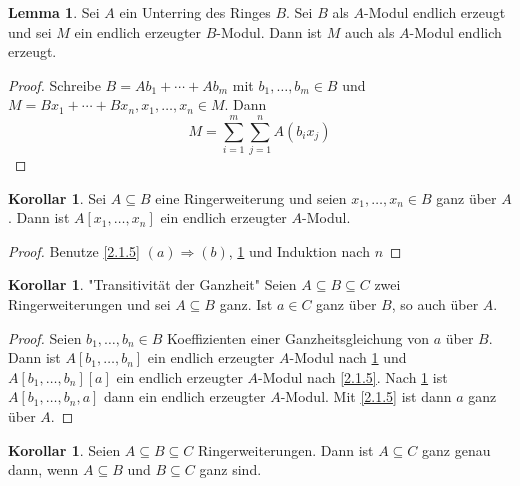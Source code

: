 \documentclass[
twoside=semi,
fontsize=12,
DIV=12, 
cleardoublepage=current,
leqno,
headings=optiontoheadandtoc, 
toc=idx
]{scrbook}
\theoremstyle{definition}
\newtheorem{lemma}[definition]{Lemma}
\newtheorem{korollar}[definition]{Korollar}
\begin{document}
	\begin{lemma}\label{2.1.6}\hfill\newline
		Sei $A$ ein Unterring des Ringes $B$. Sei $B$ als $A$-Modul endlich erzeugt und sei $M$ ein endlich erzeugter $B$-Modul. Dann ist $M$ auch als $A$-Modul endlich erzeugt.
		
		\begin{proof}
			Schreibe $B=Ab_1 + \cdots + Ab_m$ mit $b_1, \dots, b_m \in B$ und \linebreak $M = Bx_1 + \cdots + Bx_n, x_1, \dots, x_n \in M$. Dann 
			\[M = \sum_{i=1}^{m} \sum_{j=1}^{n} A(b_ix_j)\]
		\end{proof}
	\end{lemma}
	
	\begin{korollar}\label{2.1.7}\hfill\newline
		Sei $A \subseteq B$ eine Ringerweiterung und seien $x_1, \dots, x_n \in B$ ganz \"uber $A$. Dann ist $A[x_1, \dots, x_n]$ ein endlich erzeugter $A$-Modul.
		
		\begin{proof}
			Benutze \ref{2.1.5} $(a) \Longrightarrow (b)$, \ref{2.1.6} und Induktion nach $n$
		\end{proof}
	\end{korollar}

	\begin{korollar}\label{2.1.8} "Transitivit\"at der Ganzheit"\newline
		Seien $A \subseteq B \subseteq C$ zwei Ringerweiterungen und sei $A \subseteq B$ ganz. Ist $a \in C$ ganz \"uber $B$, so auch \"uber $A$.
		
		\begin{proof}
			Seien $b_1, \dots, b_n \in B$ Koeffizienten einer Ganzheitsgleichung von $a$ \"uber $B$. Dann ist $A[b_1, \dots, b_n]$ ein endlich erzeugter $A$-Modul nach \ref{2.1.7} und $A[b_1, \dots, b_n][a]$ ein endlich erzeugter $A$-Modul nach \ref{2.1.5}. Nach \ref{2.1.6} ist $A[b_1, \dots, b_n, a]$ dann ein endlich erzeugter $A$-Modul. Mit \ref{2.1.5} ist dann $a$ ganz \"uber $A$.
		\end{proof}
	\end{korollar}
	
	\begin{korollar}\label{2.1.9}\hfill\newline
		Seien $A \subseteq B \subseteq C$ Ringerweiterungen. Dann ist $A \subseteq C$ ganz genau dann, wenn $A \subseteq B$ und $B \subseteq C$ ganz sind.
	
	\end{korollar}
	
\end{document}
